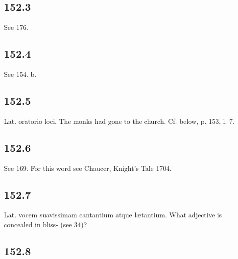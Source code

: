\subsection*{152.3}

See 176.

\subsection*{152.4}

See 154. b.

\subsection*{152.5}

Lat. oratorio loci. The monks had gone to the church. Cf. below, p. 153, l. 7.

\subsection*{152.6}

See 169. For this word see Chaucer, Knight’s Tale 1704.

\subsection*{152.7}

Lat. vocem suavissimam cantantium atque lætantium. What adjective is concealed in bliss- (see 34)?

\subsection*{152.8}

